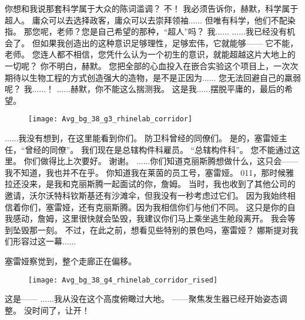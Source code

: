 \documentclass[openany]{book}
\begin{document}
\begin{dialogue}
     你想和我说那套科学属于大众的陈词滥调？
     不！
     我必须告诉你，赫默，科学属于超人。
     庸众可以去选择政客，庸众可以去崇拜领袖......
     但唯有科学，他们不配染指。
     那您呢，老师？您是自己希望的那种，“超人”吗？
     我......
     ......我已经没有机会了。
     但如果我创造出的这种意识足够理性，足够宏伟，它就能够——
     它不能，老师。
     您连人都不相信，您凭什么认为一个初生的意识，就能超越这片大地上的一切呢？
     你不明白，赫默。
     您把全部的心血投入在嵌合实验这个项目上，一次次期待以生物工程的方式创造强大的造物，是不是正因为......
     您无法回避自己的羸弱呢？
     我......！
     ......赫默，你不能这么揣测我。
     这是我......摆脱平庸的，最后的希望。
\end{dialogue}

\begin{figure}[h]
    \centering
    \texttt{[image: Avg\_bg\_38\_g3\_rhinelab\_corridor]}
\end{figure}
\begin{dialogue}
     ......我没有想到，在这里能看到你们。
     防卫科曾经的同僚们。
     是的，塞雷娅主任，“曾经的同僚”。
     我们现在是总辖构件科雇员。
     “总辖构件科”。
     您不能通过这里。
     你们做得比上次要好。
     谢谢。
     ......你们知道克丽斯腾想做什么，这只会——
     我不知道，我也并不在乎。
     你知道我在莱茵的员工号，塞雷娅。
     011，那时候雅拉还没来，是我和克丽斯腾一起面试的你，詹姆。
     当时，我也收到了其他公司的邀请，沃尔沃特科钦斯基还有沙滩伞，但我没有一秒考虑过它们。
     因为我始终相信着你们，塞雷娅，还有克丽斯腾。因为我相信你们与他们不同。
     这只是你的自我感动，詹姆，这里很快就会坠毁，我建议你们马上乘坐逃生舱段离开。
     我会等到坠毁那一刻。
     不过，在此之前，想看见些特别的景色吗，塞雷娅？
     娜斯提对我们形容过这一幕......\par
    塞雷娅察觉到，整个走廊正在偏移。
    \begin{figure}[h]
        \centering
        \texttt{[image: Avg\_bg\_38\_g4\_rhinelab\_corridor\_rised]}
    \end{figure}
     这是——
     ......我从没在这个高度俯瞰过大地。
     ——聚焦发生器已经开始姿态调整。
     没时间了，让开！
\end{dialogue}
\end{document}
